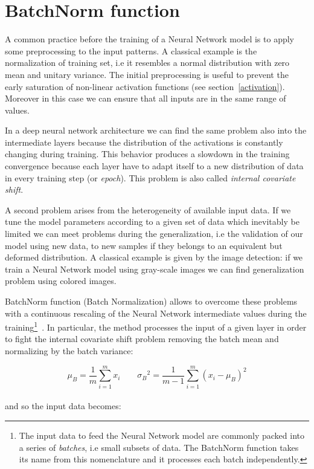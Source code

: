 \documentclass{standalone}
\begin{document}
\section[BatchNorm function]{BatchNorm function}\label{batchnorm}

A common practice before the training of a Neural Network model is to apply some preprocessing to the input patterns.
A classical example is the normalization of training set, i.e it resembles a normal distribution with zero mean and unitary variance.
The initial preprocessing is useful to prevent the early saturation of non-linear activation functions (see section~\ref{activation}).
Moreover in this case we can ensure that all inputs are in the same range of values.

In a deep neural network architecture we can find the same problem also into the intermediate layers because the distribution of the activations is constantly changing during training.
This behavior produces a slowdown in the training convergence because each layer have to adapt itself to a new distribution of data in every training step (or \emph{epoch}).
This problem is also called \emph{internal covariate shift}.

A second problem arises from the heterogeneity of available input data.
If we tune the model parameters according to a given set of data which inevitably be limited we can meet problems during the generalization, i.e the validation of our model using new data, to new samples if they belongs to an equivalent but deformed distribution.
A classical example is given by the image detection: if we train a Neural Network model using gray-scale images we can find generalization problem using colored images.

BatchNorm function (Batch Normalization) allows to overcome these problems with a continuous rescaling of the Neural Network intermediate values during the training\footnote{
  The input data to feed the Neural Network model are commonly packed into a series of \emph{batches}, i.e small subsets of data.
  The BatchNorm function takes its name from this nomenclature and it processes each batch independently.
}~\cite{Sergey2015BatchNorm}.
In particular, the method processes the input of a given layer in order to fight the internal covariate shift problem removing the batch mean and normalizing by the batch variance:

$$
\mu_B = \frac{1}{m}\sum_{i=1}^{m}x_i \quad\quad {\sigma_B}^2 = \frac{1}{m-1}\sum_{i=1}^{m}(x_i - \mu_B)^2
$$
\\
and so the input data becomes:
\end{document}
